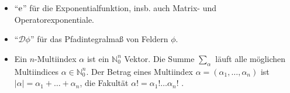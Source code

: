 \begin{itemize}
  \item "`$\text{e}$"' für die Exponentialfunktion, insb. auch Matrix- und Operatorexponentiale.
  
  \item "`$\mathcal{D}\phi$"' für das Pfadintegralmaß von Feldern $\phi$.
      
  \item Ein $n$-Multiindex $\alpha$ ist ein $\mathbb{N}_0^n$ Vektor. Die Summe $\sum_\alpha$ 
	läuft alle möglichen Multiindices $\alpha \in \mathbb{N}_0^n$. Der Betrag 
	eines Multiindex $\alpha=(\alpha_1,\ldots , \alpha_n)$ ist $|\alpha|=\alpha_1+\ldots + \alpha_n$, die 
	Fakultät $\alpha!=\alpha_1!\ldots \alpha_n!$ .
 
\end{itemize}
